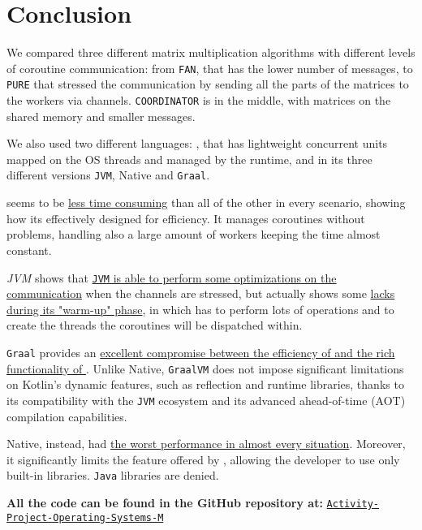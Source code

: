 \section{Conclusion}

We compared three different matrix multiplication algorithms with different levels of coroutine communication: from \texttt{FAN}, that has the lower number of messages, to \texttt{PURE} that stressed the communication by sending all the parts of the matrices to the workers via channels. \texttt{COORDINATOR} is in the middle, with matrices on the shared memory and smaller messages.

We also used two different languages: \Go, that has lightweight concurrent units mapped on the OS threads and managed by the \Go runtime, and \Kotlin in its three different versions \texttt{JVM}, Native and \texttt{Graal}.

\Go seems to be \uline{less time consuming} than all of the other in every scenario, showing how its effectively designed for efficiency. It manages coroutines without problems, handling also a large amount of workers keeping the time almost constant.

\Kotlin \textit{JVM} shows that \uline{\texttt{JVM} is able to perform some optimizations on the communication} when the channels are stressed, but actually shows some \uline{lacks during its "warm-up" phase}, in which has to perform lots of operations and to create the threads the coroutines will be dispatched within.

\Kotlin \texttt{Graal} provides an \uline{excellent compromise between the efficiency of \Go and the rich functionality of \Kotlin}. Unlike \Kotlin Native, \texttt{GraalVM} does not impose significant limitations on Kotlin's dynamic features, such as reflection and runtime libraries, thanks to its compatibility with the \texttt{JVM} ecosystem and its advanced ahead-of-time (AOT) compilation capabilities.

\Kotlin Native, instead, had \uline{the worst performance in almost every situation}. Moreover, it significantly limits the feature offered by \Kotlin, allowing the developer to use only built-in \Kotlin libraries. \texttt{Java} libraries are denied.

\begin{center}
	\textbf{All the code can be found in the GitHub repository at:}
	\href{https://github.com/LM-96/Activity-Project-Operating-Systems-M-}{\texttt{Activity-Project-Operating-Systems-M}}
\end{center}
	 